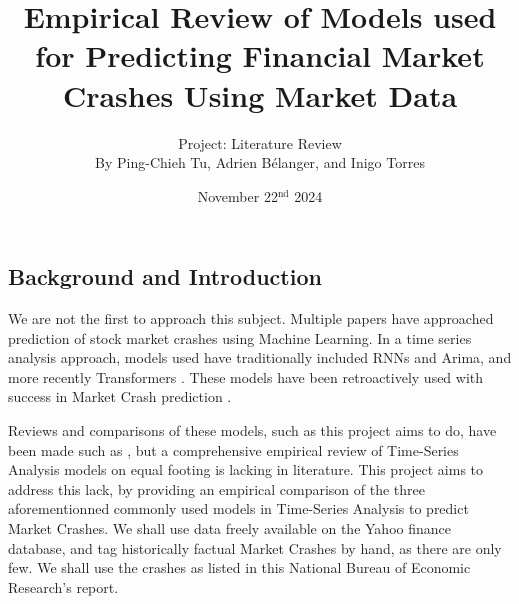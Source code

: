 \documentclass[12pt, letterpaper]{article}
\title{Empirical Review of Models used for Predicting Financial Market Crashes Using Market Data}
\author{\large Project: Literature Review \vspace{0.65em} \\ \normalsize By Ping-Chieh Tu, Adrien Bélanger, and Inigo Torres}
\date{November 22$^{\text{nd}}$ 2024}
\begin{document}
\maketitle 

\justifying %
\begin{comment}
Overall objective to keep in mind:

"In this milestone, the objective is to review the related literature to your proposal. This will better inform your methodology for your project if it involves a new idea, and it is necessary if you are comparing existing methods for a certain domain. It may even lead to a change of proposal, once you learn about existing methods out there. If you are producing a literature survey on a research topic, in this stage, you just provide a "breadth" review, in which you emphasize covering as many related works as possible and providing some preliminary organization without going into much detail."\\

Evaluation Criterias:

- Putting your proposal into context of related literature

- Coverage (are you adequately covering most relevant works)
\end{comment}
\subsection*{Background and Introduction}
We are not the first to approach this subject. 
Multiple papers have approached prediction of stock market crashes using Machine Learning. 
In a time series analysis approach, models used have traditionally included RNNs and Arima, and more recently Transformers \cite{Ahmed} \cite{ArunKumar}. 
These models have been retroactively used with success in Market Crash prediction \cite{Okpeke}. 

Reviews and comparisons of these models, such as this project aims to do, have been made such as \cite{Okpeke}, but a comprehensive empirical review of Time-Series Analysis models on equal footing is lacking in literature. 
This project aims to address this lack, by providing an empirical comparison of the three aforementionned commonly used models in Time-Series Analysis to predict Market Crashes. \cite{Ahmed} \cite{ArunKumar}
We shall use data freely available on the Yahoo finance database, and tag historically factual Market Crashes by hand, as there are only few. We shall use the crashes as listed in this National Bureau of Economic Research's report. \cite{Mishkin}
\end{document}
